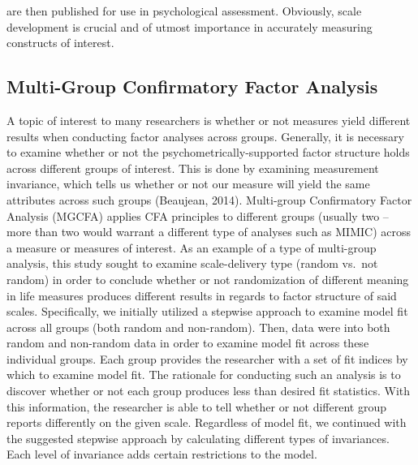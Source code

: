 \documentclass[man,draftall]{apa6}
\begin{document}
are then published for use in psychological assessment. Obviously, scale development is crucial and of utmost importance in accurately measuring constructs of interest.

\hypertarget{multi-group-confirmatory-factor-analysis}{%
\subsection{Multi-Group Confirmatory Factor Analysis}\label{multi-group-confirmatory-factor-analysis}}

A topic of interest to many researchers is whether or not measures yield different results when conducting factor analyses across groups. Generally, it is necessary to examine whether or not the psychometrically-supported factor structure holds across different groups of interest. This is done by examining measurement invariance, which tells us whether or not our measure will yield the same attributes across such groups (Beaujean, 2014). Multi-group Confirmatory Factor Analysis (MGCFA) applies CFA principles to different groups (usually two -- more than two would warrant a different type of analyses such as MIMIC) across a measure or measures of interest. As an example of a type of multi-group analysis, this study sought to examine scale-delivery type (random vs.~not random) in order to conclude whether or not randomization of different meaning in life measures produces different results in regards to factor structure of said scales. Specifically, we initially utilized a stepwise approach to examine model fit across all groups (both random and non-random). Then, data were into both random and non-random data in order to examine model fit across these individual groups. Each group provides the researcher with a set of fit indices by which to examine model fit. The rationale for conducting such an analysis is to discover whether or not each group produces less than desired fit statistics. With this information, the researcher is able to tell whether or not different group reports differently on the given scale. Regardless of model fit, we continued with the suggested stepwise approach by calculating different types of invariances. Each level of invariance adds certain restrictions to the model.
\end{document}

